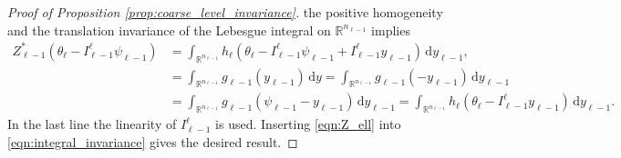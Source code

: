 \documentclass[11pt,english]{article}
\theoremstyle{plain}
\theoremstyle{plain}
\theoremstyle{plain}
\theoremstyle{plain}
\numberwithin{equation}{section}
\begin{document}
\begin{proof}[Proof of Proposition \ref{prop:coarse_level_invariance}]
	the positive homogeneity and the translation invariance of the Lebesgue
	integral on $\mathbb{R}^{n_{\ell-1}}$ implies
	\begin{equation}
		\begin{aligned}
			Z^*_{\ell-1} (\theta_\ell-I_{\ell-1}^\ell\psi_{\ell-1}) & =\int_{\mathbb{R}^{n_{\ell-1}}}h_{\ell}(\theta_\ell-I_{\ell-1}^\ell\psi_{\ell-1}+I_{\ell-1}^\ell y_{\ell-1})\,\mathrm{d}y_{\ell-1},                                                               \\
			                                                        & =\int_{\mathbb{R}^{n_{\ell-1}}}g_{\ell-1}(y_{\ell-1})\,\mathrm{d}y=\int_{\mathbb{R}^{n_{\ell-1}}}g_{\ell-1}(-y_{\ell-1})\,\mathrm{d}y_{\ell-1}                                                    \\
			                                                        & =\int_{\mathbb{R}^{n_{\ell-1}}}g_{\ell-1}(\psi_{\ell-1}-y_{\ell-1})\,\mathrm{d}y_{\ell-1}=\int_{\mathbb{R}^{n_{\ell-1}}}h_{\ell}(\theta_{\ell}-I_{\ell-1}^\ell y_{\ell-1})\,\mathrm{d}y_{\ell-1}.
			\label{eqn:Z_ell}
		\end{aligned}
	\end{equation}
	In the last line the linearity of $I_{\ell-1}^{\ell}$ is used. Inserting \eqref{eqn:Z_ell} into \eqref{eqn:integral_invariance} gives the desired result.
\end{proof}
\end{document}
